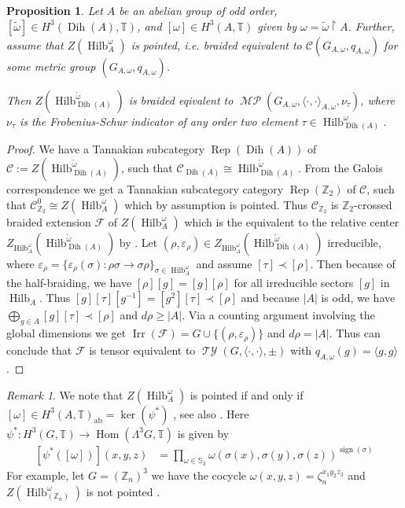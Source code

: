 \documentclass[twoside,11pt,reqno]{amsart}
\makeatletter
\newtheorem{prop}[thm]{Proposition}
\theoremstyle{definition}
\theoremstyle{remark}
\newtheorem{rmk}[thm]{Remark}
\newcommand{\cF}{\mathcal{F}}
\newcommand{\cC}{\mathcal{C}}
\newcommand{\TT}{\mathbb{T}}
\newcommand{\ZZ}{\mathbb{Z}}
\DeclareMathOperator{\Rep}{Rep}
\DeclareMathOperator{\Hom}{Hom}
\DeclareMathOperator{\sign}{sign}
\DeclareRobustCommand{\ie}{i.e.\@\xspace}
\DeclareMathOperator{\Dih}{Dih}
\DeclareMathOperator*{\TY}{\mathcal{TY}}
\DeclareMathOperator*{\MP}{\mathcal{MP}}
\DeclareMathOperator{\Vect}{Hilb}
\DeclareMathOperator{\Irr}{Irr}
\newcommand{\bi}[2]{\langle #1,#2\rangle}
\newcommand{\bislotslot}{\bi\cdot\cdot}
\makeatother
\begin{document}
\begin{prop} 
  \label{prop:SomeDihAreMeptaplectic}
  Let $A$ be an abelian group of odd order, 
  $[\tilde\omega]\in H^3(\Dih(A),\TT)$,
  and $[\omega]\in H^3(A,\TT)$ given by $\omega=\tilde \omega\restriction A$.
  Further, assume that $Z(\Vect^{\omega}_A)$ is pointed, \ie
  braided equivalent to  $\cC(G_{A,\omega},q_{A,\omega})$
  for some metric group $(G_{A,\omega},q_{A,\omega})$.
  
  Then $Z(\Vect_{\Dih(A)}^{\tilde\omega})$ is braided eqivalent to 
  $\MP(G_{A,\omega},\bislotslot_{A,\omega},\nu_\tau)$, where 
  $\nu_\tau$ is the Frobenius-Schur indicator of any order two element 
  $\tau\in\Vect_{\Dih(A)}^\omega$.
\end{prop}
\begin{proof} 
  We have a Tannakian subcategory $\Rep(\Dih(A))$ of
  $\cC:=Z(\Vect^{\tilde\omega}_{\Dih(A)})$, such that 
  $\cC_{\Dih(A)}\cong \Vect^{\tilde\omega}_{\Dih(A)}$.
  From the Galois correspondence we get a Tannakian subcategory category 
  $\Rep(\ZZ_2)$ of $\cC$, such that $\cC_{\ZZ_2}^0\cong Z(\Vect_A^\omega)$ 
  which by assumption is pointed.
  Thus $\cC_{\ZZ_2}$ is $\ZZ_2$-crossed braided extension $\cF$ of 
  $Z(\Vect_A^\omega)$ which is the equivalent to the relative center 
  $Z_{\Vect_A^\omega}({\Vect_{\Dih(A)}^{\tilde\omega}})$ by 
  \cite[Theorem 3.5]{GeNaNi2009}. 
  Let $(\rho,\varepsilon_\rho)
    \in Z_{\Vect_A^\omega}({\Vect_{\Dih(A)}^{\tilde\omega}})$ 
  irreducible, where $\varepsilon_\rho
    =\{\varepsilon_\rho(\sigma)\colon 
    \rho\sigma\to \sigma \rho\}_{\sigma\in \Vect_A^\omega}$ 
  and assume $[\tau]\prec [\rho]$. 
  Then because of the half-braiding, we have $[\rho][g]=[g][\rho]$ 
  for all irreducible sectors $[g]$ in $\Vect_A$.
  Thus $[g][\tau ][g^{-1}] =[g^2][\tau]\prec [\rho]$ and because $|A|$ is odd, 
  we have $\bigoplus_{g\in A}[g][\tau]\prec [\rho]$ and $d\rho \geq |A|$.
  Via a counting argument involving the global dimensions we get
  $\Irr(\cF)=G\cup\{(\rho,\varepsilon_\rho)\}$ and $d\rho=|A|$.
  Thus can conclude that $\cF$ is tensor equivalent to 
  $\TY(G,\bislotslot,\pm)$ with $q_{A,\omega}(g)=\bi g g$.
\end{proof}
\begin{rmk}
  \label{rmk:H3ab}
  We note that $Z(\Vect^{\omega}_A)$ is pointed if and only if 
  $[\omega] \in H^3(A,\TT)_{\mathrm{ab}}=\ker(\psi^\ast)$ 
  \cite[Corollary 3.6]{NgMa2001}, see also \cite[Proposition 4.1]{Ng2003}.
  Here $\psi^\ast\colon H^3(G,\TT)\to \Hom(\Lambda^3
  G,\TT)$ is  given by
  \begin{align}
    \left[\psi^\ast([\omega])\right](x,y,z)&=
      \prod_{\omega\in\mathbb{S}_3}\omega(\sigma(x),\sigma(y),\sigma(z))
        ^{\sign(\sigma)}
  \end{align}
  For example, let $G=(\ZZ_n)^3$ we have the cocycle 
  $\omega(x,y,z)=\zeta_n^{x_1y_2z_3}$ and 
  $Z(\Vect_{(\ZZ_n)}^\omega)$ is not pointed \cite[Example 4.5]{Ng2003}.
\end{rmk}
\end{document}
